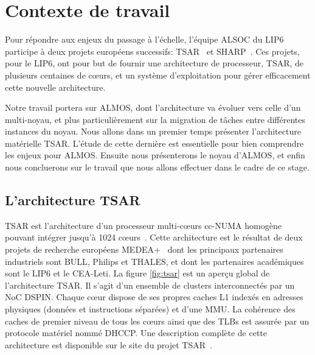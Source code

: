 \chapter{Contexte de travail}
\label{sec:context}

  Pour répondre aux enjeux du passage à l'échelle, l'équipe ALSOC du LIP6
  participe à deux projets européens successifs: TSAR~\cite{tsar2008} et
  SHARP~\cite{sharp2012}. Ces projets, pour le LIP6, ont pour but de fournir une
  architecture de processeur, TSAR, de plusieurs centaines de c\oe urs, et un
  système d'exploitation pour gérer efficacement cette nouvelle architecture.

  Notre travail portera sur ALMOS, dont l'architecture va évoluer vers celle
  d'un multi-noyau, et plus particulièrement sur la migration de tâches entre
  différentes instances du noyau. Nous allons dans un premier temps présenter
  l'architecture matérielle TSAR. L'étude de cette dernière est essentielle pour
  bien comprendre les enjeux pour ALMOS. Ensuite nous présenterons le noyau
  d'ALMOS, et enfin nous concluerons sur le travail que nous allons effectuer
  dans le cadre de ce stage.
  

  \section{L'architecture TSAR}
  \label{sec:tsar}

    TSAR est l'architecture d’un processeur multi-c\oe urs cc-NUMA homogène
    pouvant intégrer jusqu’à 1024 c\oe urs~\cite{greiner2009tsar}. Cette
    architecture est le résultat de deux projets de recherche européens
    MEDEA+~\cite{tsar2008,sharp2012} dont les principaux partenaires industriels
    sont BULL, Philips et THALES, et dont les partenaires académiques sont le
    LIP6 et le CEA-Leti. La figure \ref{fig:tsar} est un aperçu global de
    l'architecture TSAR. Il s'agit d'un ensemble de clusters interconnectés par
    un NoC
    DSPIN. Chaque c\oe ur dispose de ses propres caches L1 indexés en
    adresses physiques (données et instructions séparées) et d'une MMU. La
    cohérence des caches de premier niveau de tous les c\oe urs ainsi que des
    TLBs est assurée par un
    protocole matériel nommé DHCCP. Une description complète de cette architecture est
    disponible sur le site du projet TSAR~\cite{tsar2008web}.

